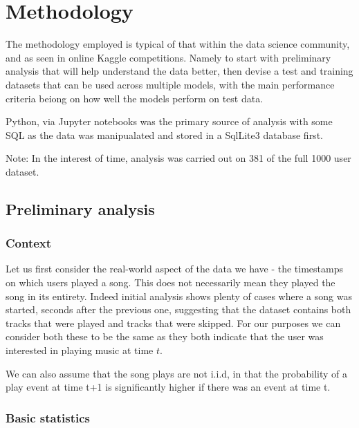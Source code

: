 
\chapter{Methodology} %

\label{Chapter3} %

The methodology employed is typical of that within the data science community, and as seen in online Kaggle competitions. Namely to start with preliminary analysis that will help understand the data better, then devise a test and training datasets that can be used across multiple models, with the main performance criteria beiong on how well the models perform on test data.

Python, via Jupyter notebooks was the primary source of analysis with some SQL as the data was manipualated and stored in a SqlLite3 database first.

Note: In the interest of time, analysis was carried out on 381 of the full 1000 user dataset.

\section{Preliminary analysis}

\subsection{Context}

Let us first consider the real-world aspect of the data we have - the timestamps on which users played a song. This does not necessarily mean they played the song in its entirety. Indeed initial analysis shows plenty of cases where a song was started, seconds after the previous one, suggesting that the dataset contains both tracks that were played and tracks that were skipped. For our purposes we can consider both these to be the same as they both indicate that the user was interested in playing music at time $t$.

We can also assume that the song plays are not i.i.d, in that the probability of a play event at time t+1 is significantly higher if there was an event at time t. 

\subsection{Basic statistics} 

